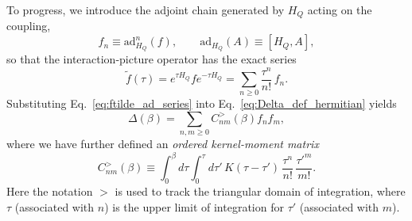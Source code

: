 To progress, we introduce the adjoint chain generated by $H_Q$ acting on the coupling,
\begin{equation}
    f_n \equiv \mathrm{ad}_{H_Q}^n(f),\qquad \mathrm{ad}_{H_Q}(A)\equiv[H_Q,A],
    \label{eq:adjoint_chain_def}
\end{equation}
so that the interaction-picture operator has the exact series
\begin{equation}
    \tilde f(\tau)=e^{\tau H_Q} f e^{-\tau H_Q}=\sum_{n\ge 0}\frac{\tau^n}{n!}\, f_n.
    \label{eq:ftilde_ad_series}
\end{equation}
Substituting Eq.~\eqref{eq:ftilde_ad_series} into Eq.~\eqref{eq:Delta_def_hermitian} yields
\begin{equation}
    \Delta(\beta)
    =\sum_{n,m\ge 0} C^{>}_{nm}(\beta)f_nf_m,
    \label{eq:Delta_Cnm_fnfm_no_matsubara}
\end{equation}
where we have further defined an \emph{ordered kernel-moment matrix}
\begin{equation}
    C^{>}_{nm}(\beta)\equiv
    \int_0^\beta d\tau\int_0^\tau d\tau'\,
    K(\tau-\tau')\,\frac{\tau^n}{n!}\,\frac{\tau'^m}{m!}.
    \label{eq:Cnm_def_triangle}
\end{equation}
Here the notation $>$ is used to track the triangular domain of integration, where $\tau$ (associated with $n$) is the upper limit of integration for $\tau'$ (associated with $m$).


